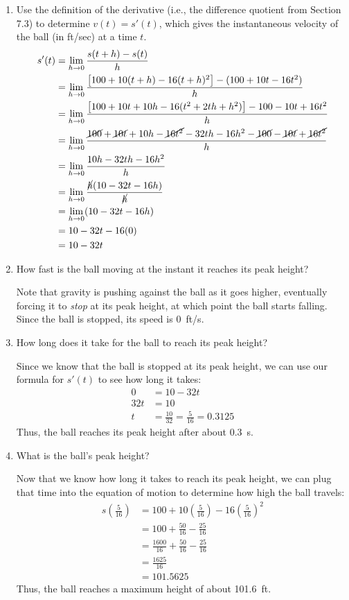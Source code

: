 \documentclass[letterpaper,12pt,fleqn]{article}
\begin{document}
\begin{enumerate}
\item Use the definition of the derivative (i.e., the difference quotient from Section 7.3) to determine \(v(t)=s'(t)\),
  which gives the instantaneous velocity of the ball (in ft/sec) at a time \(t\).
  \begin{align*}
    s'(t) &= \lim_{h\to0}\frac{s(t+h)-s(t)}{h} \\
    &= \lim_{h\to0}\frac{\left[100+10(t+h)-16(t+h)^2\right]-(100+10t-16t^2)}{h} \\
    &= \lim_{h\to0}\frac{\left[100+10t+10h-16(t^2+2th+h^2)\right]-100-10t+16t^2}{h} \\
    &= \lim_{h\to0}\frac{\cancel{100}+\cancel{10t}+10h-\cancel{16t^2}-32th-16h^2-\cancel{100}-\cancel{10t}+\cancel{16t^2}}{h} \\
    &= \lim_{h\to0}\frac{10h-32th-16h^2}{h} \\
    &= \lim_{h\to0}\frac{\cancel{h}(10-32t-16h)}{\cancel{h}} \\
    &= \lim_{h\to0}(10-32t-16h) \\
    &= 10-32t-16(0) \\
    &= 10-32t
  \end{align*}
  
\item How fast is the ball moving at the instant it reaches its peak height?

  Note that gravity is pushing against the ball as it goes higher, eventually forcing it to \emph{stop} at its peak height,
  at which point the ball starts falling.  Since the ball is stopped, its speed is \SI{0}{ft/s}.
  
\item How long does it take for the ball to reach its peak height?

  Since we know that the ball is stopped at its peak height, we can use our formula for \(s'(t)\) to see how long it takes:
  \begin{align*}
    0 &= 10-32t \\
    32t &= 10 \\
    t &= \frac{10}{32} = \frac{5}{16}=0.3125
  \end{align*}
  Thus, the ball reaches its peak height after about \SI{0.3}{s}.
  
\item What is the ball's peak height?

  Now that we know how long it takes to reach its peak height, we can plug that time into the equation of motion to determine
  how high the ball travels:
  \begin{align*}
    s\left(\frac{5}{16}\right) &= 100+10\left(\frac{5}{16}\right)-16\left(\frac{5}{16}\right)^2 \\
    &= 100+\frac{50}{16}-\frac{25}{16} \\
    &= \frac{1600}{16}+\frac{50}{16}-\frac{25}{16} \\
    &= \frac{1625}{16} \\
    &= 101.5625
  \end{align*}
  Thus, the ball reaches a maximum height of about \SI{101.6}{ft}.
  

\end{enumerate}
\end{document}
